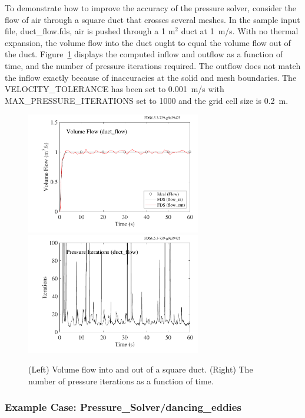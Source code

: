 \documentclass[11pt]{book}
\begin{document}
To demonstrate how to improve the accuracy of the pressure solver, consider the flow of air through a square duct that crosses several meshes. In the sample input file, {\ct duct\_flow.fds}, air is pushed through a 1 m$^2$ duct at 1~m/s. With no thermal expansion, the volume flow into the duct ought to equal the volume flow out of the
duct. Figure~\ref{duct_flow} displays the computed inflow and outflow as a function of time, and the number of pressure iterations required. The outflow does not match
the inflow exactly because of inaccuracies at the solid and mesh boundaries. The {\ct VELOCITY\_TOLERANCE} has been set to 0.001~m/s with {\ct MAX\_PRESSURE\_ITERATIONS} set to 1000 and the grid cell size is 0.2~m.

\begin{figure}[ht]
\begin{center}
\includegraphics[width=3in]{SCRIPT_FIGURES/duct_flow}
\includegraphics[width=3in]{SCRIPT_FIGURES/duct_flow_iterations}
\end{center}
\caption[Results of the {\ct duct\_flow} test case]{(Left) Volume flow into and out of a square duct. (Right) The number of pressure iterations as a function of time.}
\label{duct_flow}
\end{figure}


\subsubsection{Example Case: Pressure\_Solver/dancing\_eddies}
\end{document}
